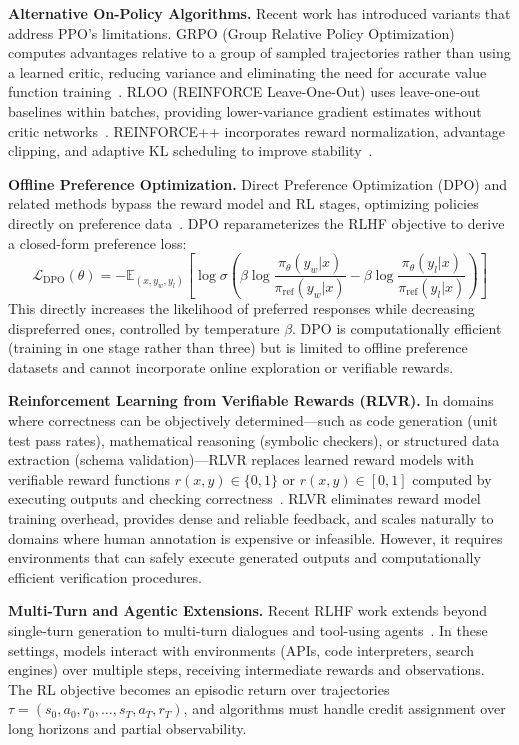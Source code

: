 \documentclass[conference]{IEEEtran}
\begin{document}
\textbf{Alternative On-Policy Algorithms.} Recent work has introduced variants that address PPO's limitations. GRPO (Group Relative Policy Optimization) computes advantages relative to a group of sampled trajectories rather than using a learned critic, reducing variance and eliminating the need for accurate value function training~\cite{grpo-paper}. RLOO (REINFORCE Leave-One-Out) uses leave-one-out baselines within batches, providing lower-variance gradient estimates without critic networks~\cite{rloo-paper}. REINFORCE++ incorporates reward normalization, advantage clipping, and adaptive KL scheduling to improve stability~\cite{reinforce-plus-paper}.

\textbf{Offline Preference Optimization.} Direct Preference Optimization (DPO) and related methods bypass the reward model and RL stages, optimizing policies directly on preference data~\cite{dpo-paper}. DPO reparameterizes the RLHF objective to derive a closed-form preference loss:
\[
\mathcal{L}_{\text{DPO}}(\theta) = -\mathbb{E}_{(x, y_w, y_l)} \left[ \log \sigma\left( \beta \log \frac{\pi_\theta(y_w|x)}{\pi_{\text{ref}}(y_w|x)} - \beta \log \frac{\pi_\theta(y_l|x)}{\pi_{\text{ref}}(y_l|x)} \right) \right]
\]
This directly increases the likelihood of preferred responses while decreasing dispreferred ones, controlled by temperature $\beta$. DPO is computationally efficient (training in one stage rather than three) but is limited to offline preference datasets and cannot incorporate online exploration or verifiable rewards.

\textbf{Reinforcement Learning from Verifiable Rewards (RLVR).} In domains where correctness can be objectively determined—such as code generation (unit test pass rates), mathematical reasoning (symbolic checkers), or structured data extraction (schema validation)—RLVR replaces learned reward models with verifiable reward functions $r(x, y) \in \{0, 1\}$ or $r(x, y) \in [0, 1]$ computed by executing outputs and checking correctness~\cite{codex-paper, minerva-paper}. RLVR eliminates reward model training overhead, provides dense and reliable feedback, and scales naturally to domains where human annotation is expensive or infeasible. However, it requires environments that can safely execute generated outputs and computationally efficient verification procedures.

\textbf{Multi-Turn and Agentic Extensions.} Recent RLHF work extends beyond single-turn generation to multi-turn dialogues and tool-using agents~\cite{toolformer-paper, react-paper}. In these settings, models interact with environments (APIs, code interpreters, search engines) over multiple steps, receiving intermediate rewards and observations. The RL objective becomes an episodic return over trajectories $\tau = (s_0, a_0, r_0, \ldots, s_T, a_T, r_T)$, and algorithms must handle credit assignment over long horizons and partial observability.
\end{document}
